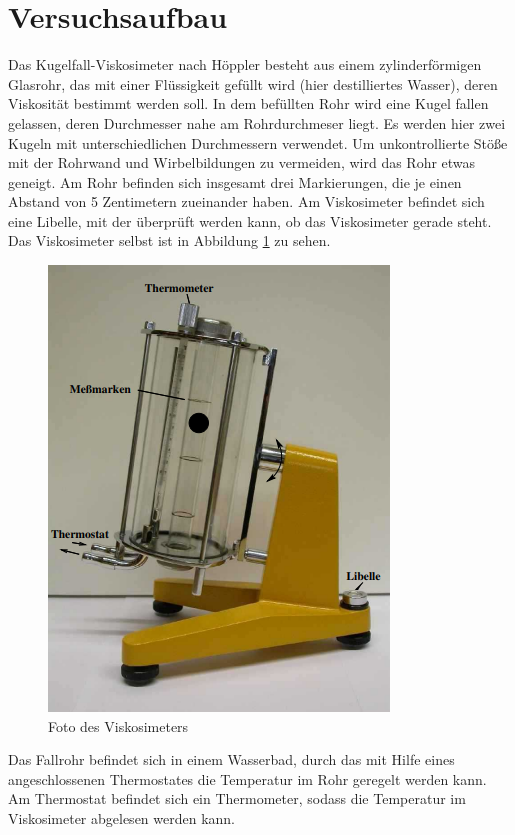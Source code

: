 \section{Versuchsaufbau}
\label{sec:durchfuehrung}
Das Kugelfall-Viskosimeter nach Höppler besteht aus einem zylinderförmigen Glasrohr,
das mit einer Flüssigkeit gefüllt wird (hier destilliertes Wasser), deren Viskosität bestimmt werden soll. 
In dem befüllten Rohr wird eine Kugel fallen gelassen, deren Durchmesser nahe am Rohrdurchmeser liegt.
Es werden hier zwei Kugeln mit unterschiedlichen Durchmessern verwendet. 
Um unkontrollierte Stöße mit der Rohrwand und Wirbelbildungen zu vermeiden, wird das Rohr etwas geneigt.
Am Rohr befinden sich insgesamt drei Markierungen, die je einen Abstand von 5 Zentimetern zueinander haben.
Am Viskosimeter befindet sich eine Libelle, mit der überprüft werden kann, ob das Viskosimeter gerade steht.
Das Viskosimeter selbst ist in Abbildung \ref{fig:viskosimeter} zu sehen.
\begin{figure}
    \centering
    \includegraphics[]{versuchsaufbau.png}
    \caption[]{Foto des Viskosimeters}
    \label{fig:viskosimeter}
\end{figure}
Das Fallrohr befindet sich in einem Wasserbad, durch das mit Hilfe eines angeschlossenen Thermostates die Temperatur im Rohr geregelt werden kann.
Am Thermostat befindet sich ein Thermometer, sodass die Temperatur im Viskosimeter abgelesen werden kann.

